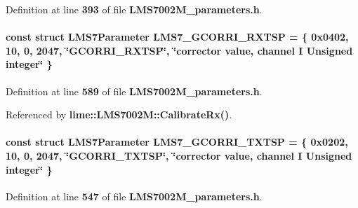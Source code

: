 Definition at line {\bf 393} of file {\bf L\+M\+S7002\+M\+\_\+parameters.\+h}.

\paragraph[{L\+M\+S7\+\_\+\+G\+C\+O\+R\+R\+I\+\_\+\+R\+X\+T\+SP}]{\setlength{\rightskip}{0pt plus 5cm}const struct {\bf L\+M\+S7\+Parameter} L\+M\+S7\+\_\+\+G\+C\+O\+R\+R\+I\+\_\+\+R\+X\+T\+SP = \{ 0x0402, 10, 0, 2047, \char`\"{}\+G\+C\+O\+R\+R\+I\+\_\+\+R\+X\+T\+S\+P\char`\"{}, \char`\"{}corrector value, channel I Unsigned integer\char`\"{} \}\hspace{0.3cm}{\ttfamily [static]}}\label{LMS7002M__parameters_8h_a99a89ded9b3c0eeb4c16abfccc6ba9d1}


Definition at line {\bf 589} of file {\bf L\+M\+S7002\+M\+\_\+parameters.\+h}.



Referenced by {\bf lime\+::\+L\+M\+S7002\+M\+::\+Calibrate\+Rx()}.

\paragraph[{L\+M\+S7\+\_\+\+G\+C\+O\+R\+R\+I\+\_\+\+T\+X\+T\+SP}]{\setlength{\rightskip}{0pt plus 5cm}const struct {\bf L\+M\+S7\+Parameter} L\+M\+S7\+\_\+\+G\+C\+O\+R\+R\+I\+\_\+\+T\+X\+T\+SP = \{ 0x0202, 10, 0, 2047, \char`\"{}\+G\+C\+O\+R\+R\+I\+\_\+\+T\+X\+T\+S\+P\char`\"{}, \char`\"{}corrector value, channel I Unsigned integer\char`\"{} \}\hspace{0.3cm}{\ttfamily [static]}}\label{LMS7002M__parameters_8h_ab49cf63214951d208679043e1df797fc}


Definition at line {\bf 547} of file {\bf L\+M\+S7002\+M\+\_\+parameters.\+h}.



